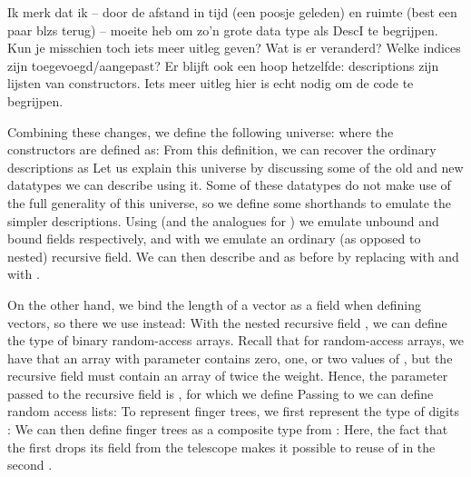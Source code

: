\begin{outline}
    Ik merk dat ik -- door de afstand in tijd (een poosje geleden) en
   ruimte (best een paar blzs terug) -- moeite heb om zo'n grote data
   type als DescI te begrijpen. Kun je misschien toch iets meer uitleg
   geven? Wat is er veranderd? Welke indices zijn toegevoegd/aangepast?
   Er blijft ook een hoop hetzelfde: descriptions zijn lijsten van
   constructors. Iets meer uitleg hier is echt nodig om de code te
   begrijpen.
\end{outline}
Combining these changes, we define the following universe:
where the constructors are defined as:
From this definition, we can recover the ordinary descriptions as
Let us explain this universe by discussing some of the old and new datatypes we can describe using it. Some of these datatypes do not make use of the full generality of this universe, so we define some shorthands to emulate the simpler descriptions. Using 
(and the analogues for ) we emulate unbound and bound fields respectively, and with 
we emulate an ordinary (as opposed to nested) recursive field. We can then describe \bN{} and  as before
by replacing  with  and  with .

On the other hand, we bind the length of a vector as a field when defining vectors, so there we use  instead:
With the nested recursive field , we can define the type of binary random-access arrays. Recall that for random-access arrays, we have that an array with parameter  contains zero, one, or two values of , but the recursive field must contain an array of twice the weight. Hence, the parameter passed to the recursive field is , for which we define
Passing  to  we can define random access lists:  
To represent finger trees, we first represent the type of digits : 
We can then define finger trees as a composite type from :
Here, the fact that the first  drops its field from the telescope makes it possible to reuse of  in the second .

